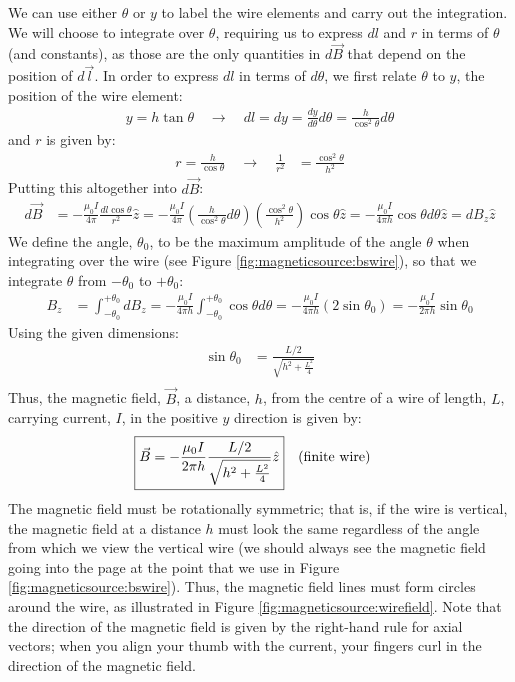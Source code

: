 We can use either $\theta$ or $y$ to label the wire elements and carry out the integration. We will choose to integrate over $\theta$, requiring us to express $dl$ and $r$ in terms of $\theta$ (and constants), as those are the only quantities in $d\vec B$ that depend on the position of $d\vec l$. In order to express $dl$ in terms of $d\theta$, we first relate $\theta$ to $y$, the position of the wire element:
\begin{align*}
y = h\tan\theta\quad \to \quad
dl = dy = \frac{dy}{d\theta}d\theta = \frac{h}{\cos^2\theta}d\theta
\end{align*}
and $r$ is given by:
\begin{align*}
r=\frac{h}{\cos\theta}\quad \to \quad
\frac{1}{r^2}&=\frac{\cos^2\theta}{h^2}
\end{align*}
Putting this altogether into $d\vec B$:
\begin{align*}
d\vec B &=-\frac{\mu_0 I}{4\pi}\frac{dl\cos\theta}{r^2}\hat z = -\frac{\mu_0 I}{4\pi}\left(\frac{h}{\cos^2\theta}d\theta\right) \left( \frac{\cos^2\theta}{h^2} \right)\cos\theta\hat z=-\frac{\mu_0 I}{4\pi h}\cos\theta d\theta \hat z=dB_z\hat z
\end{align*}
We define the angle, $\theta_0$, to be the maximum amplitude of the angle $\theta$ when integrating over the wire (see Figure \ref{fig:magneticsource:bswire}), so that we integrate $\theta$ from $-\theta_0$ to $+\theta_0$:
\begin{align*}
B_z&=\int_{-\theta_0}^{+\theta_0}dB_z= -\frac{\mu_0 I}{4\pi h} \int_{-\theta_0}^{+\theta_0}\cos\theta d\theta=-\frac{\mu_0 I}{4\pi h}(2\sin\theta_0) =-\frac{\mu_0 I}{2\pi h}\sin\theta_0
\end{align*}
Using the given dimensions:
\begin{align*}
\sin\theta_0&=\frac{L/2}{\sqrt{h^2+\frac{L^2}{4}}}\\
\end{align*}
Thus, the magnetic field, $\vec B$, a distance, $h$, from the centre of a wire of length, $L$, carrying current, $I$, in the positive $y$ direction is given by:
\begin{align*}
\Aboxed{\vec B &= -\frac{\mu_0 I}{2\pi h}\frac{L/2}{\sqrt{h^2+\frac{L^2}{4}}}\hat z}\quad\text{(finite wire)}
\end{align*}
The magnetic field must be rotationally symmetric; that is, if the wire is vertical, the magnetic field at a distance $h$ must look the same regardless of the angle from which we view the vertical wire (we should always see the magnetic field going into the page at the point that we use in Figure \ref{fig:magneticsource:bswire}). Thus, the magnetic field lines must form circles around the wire, as illustrated in Figure \ref{fig:magneticsource:wirefield}. Note that the direction of the magnetic field is given by the right-hand rule for axial vectors; when you align your thumb with the current, your fingers curl in the direction of the magnetic field.

